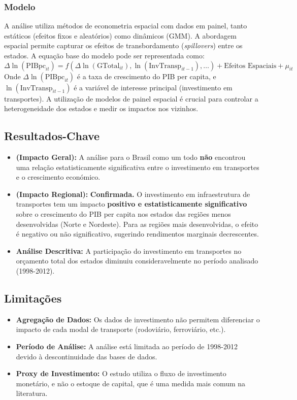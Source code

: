 \documentclass[12pt]{article}
\begin{document}
\subsubsection*{Modelo}
A análise utiliza métodos de econometria espacial com dados em painel, tanto estáticos (efeitos fixos e aleatórios) como dinâmicos (GMM). A abordagem espacial permite capturar os efeitos de transbordamento (\textit{spillovers}) entre os estados. A equação base do modelo pode ser representada como:
\[
\Delta \ln(\text{PIBpc}_{it}) = f(\Delta \ln(\text{GTotal}_{it}), \ln(\text{InvTransp}_{it-1}), \dots) + \text{Efeitos Espaciais} + \mu_{it}
\]
Onde $\Delta \ln(\text{PIBpc}_{it})$ é a taxa de crescimento do PIB per capita, e $\ln(\text{InvTransp}_{it-1})$ é a variável de interesse principal (investimento em transportes). A utilização de modelos de painel espacial é crucial para controlar a heterogeneidade dos estados e medir os impactos nos vizinhos.


\subsection*{Resultados-Chave}
\begin{itemize}
    \item \textbf{(Impacto Geral):} A análise para o Brasil como um todo \textbf{não} encontrou uma relação estatisticamente significativa entre o investimento em transportes e o crescimento económico.
    \item \textbf{(Impacto Regional):} \textbf{Confirmada.} O investimento em infraestrutura de transportes tem um impacto \textbf{positivo e estatisticamente significativo} sobre o crescimento do PIB per capita nos estados das regiões menos desenvolvidas (Norte e Nordeste). Para as regiões mais desenvolvidas, o efeito é negativo ou não significativo, sugerindo rendimentos marginais decrescentes.
    \item \textbf{Análise Descritiva:} A participação do investimento em transportes no orçamento total dos estados diminuiu consideravelmente no período analisado (1998-2012).
\end{itemize}

\subsection*{Limitações}
\begin{itemize}
    \item \textbf{Agregação de Dados:} Os dados de investimento não permitem diferenciar o impacto de cada modal de transporte (rodoviário, ferroviário, etc.).
    \item \textbf{Período de Análise:} A análise está limitada ao período de 1998-2012 devido à descontinuidade das bases de dados.
    \item \textbf{Proxy de Investimento:} O estudo utiliza o fluxo de investimento monetário, e não o estoque de capital, que é uma medida mais comum na literatura.
\end{itemize}
\end{document}
